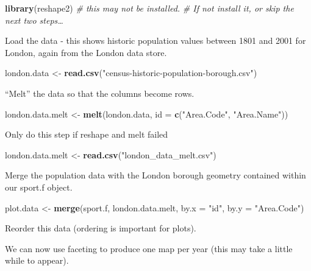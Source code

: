 \documentclass[]{article}
\newenvironment{Shaded}{}{}
\newcommand{\KeywordTok}[1]{\textcolor[rgb]{0.00,0.44,0.13}{\textbf{{#1}}}}
\newcommand{\DataTypeTok}[1]{\textcolor[rgb]{0.56,0.13,0.00}{{#1}}}
\newcommand{\StringTok}[1]{\textcolor[rgb]{0.25,0.44,0.63}{{#1}}}
\newcommand{\CommentTok}[1]{\textcolor[rgb]{0.38,0.63,0.69}{\textit{{#1}}}}
\newcommand{\NormalTok}[1]{{#1}}
\begin{document}
\begin{Shaded}
\begin{Highlighting}[]
\KeywordTok{library}\NormalTok{(reshape2)  }\CommentTok{# this may not be installed. }
\CommentTok{# If not install it, or skip the next two steps…}
\end{Highlighting}
\end{Shaded}
Load the data - this shows historic population values between 1801 and
2001 for London, again from the London data store.

\begin{Shaded}
\begin{Highlighting}[]
\NormalTok{london.data <- }\KeywordTok{read.csv}\NormalTok{(}\StringTok{"census-historic-population-borough.csv"}\NormalTok{)}
\end{Highlighting}
\end{Shaded}
``Melt'' the data so that the columns become rows.

\begin{Shaded}
\begin{Highlighting}[]
\NormalTok{london.data.melt <- }\KeywordTok{melt}\NormalTok{(london.data, }\DataTypeTok{id =} \KeywordTok{c}\NormalTok{(}\StringTok{"Area.Code"}\NormalTok{, }\StringTok{"Area.Name"}\NormalTok{))}
\end{Highlighting}
\end{Shaded}
Only do this step if reshape and melt failed

\begin{Shaded}
\begin{Highlighting}[]
\NormalTok{london.data.melt <- }\KeywordTok{read.csv}\NormalTok{(}\StringTok{"london_data_melt.csv"}\NormalTok{)}
\end{Highlighting}
\end{Shaded}
Merge the population data with the London borough geometry contained
within our sport.f object.

\begin{Shaded}
\begin{Highlighting}[]
\NormalTok{plot.data <- }\KeywordTok{merge}\NormalTok{(sport.f, london.data.melt, }\DataTypeTok{by.x =} \StringTok{"id"}\NormalTok{, }\DataTypeTok{by.y =} \StringTok{"Area.Code"}\NormalTok{)}
\end{Highlighting}
\end{Shaded}
Reorder this data (ordering is important for plots).

\begin{Shaded}
\end{Shaded}
We can now use faceting to produce one map per year (this may take a
little while to appear).
\end{document}
